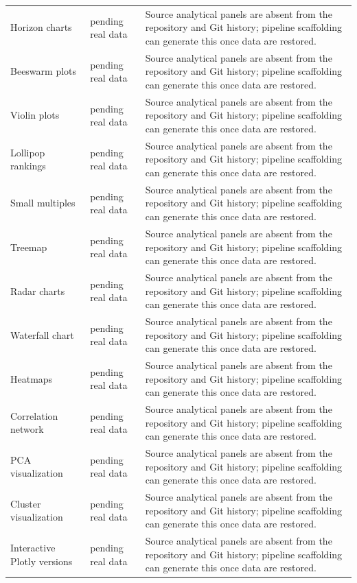 \begin{tabular}{lll}
Horizon charts & pending real data & Source analytical panels are absent from the repository and Git history; pipeline scaffolding can generate this once data are restored. \\
Beeswarm plots & pending real data & Source analytical panels are absent from the repository and Git history; pipeline scaffolding can generate this once data are restored. \\
Violin plots & pending real data & Source analytical panels are absent from the repository and Git history; pipeline scaffolding can generate this once data are restored. \\
Lollipop rankings & pending real data & Source analytical panels are absent from the repository and Git history; pipeline scaffolding can generate this once data are restored. \\
Small multiples & pending real data & Source analytical panels are absent from the repository and Git history; pipeline scaffolding can generate this once data are restored. \\
Treemap & pending real data & Source analytical panels are absent from the repository and Git history; pipeline scaffolding can generate this once data are restored. \\
Radar charts & pending real data & Source analytical panels are absent from the repository and Git history; pipeline scaffolding can generate this once data are restored. \\
Waterfall chart & pending real data & Source analytical panels are absent from the repository and Git history; pipeline scaffolding can generate this once data are restored. \\
Heatmaps & pending real data & Source analytical panels are absent from the repository and Git history; pipeline scaffolding can generate this once data are restored. \\
Correlation network & pending real data & Source analytical panels are absent from the repository and Git history; pipeline scaffolding can generate this once data are restored. \\
PCA visualization & pending real data & Source analytical panels are absent from the repository and Git history; pipeline scaffolding can generate this once data are restored. \\
Cluster visualization & pending real data & Source analytical panels are absent from the repository and Git history; pipeline scaffolding can generate this once data are restored. \\
Interactive Plotly versions & pending real data & Source analytical panels are absent from the repository and Git history; pipeline scaffolding can generate this once data are restored. \\
\hline
\end{tabular}

